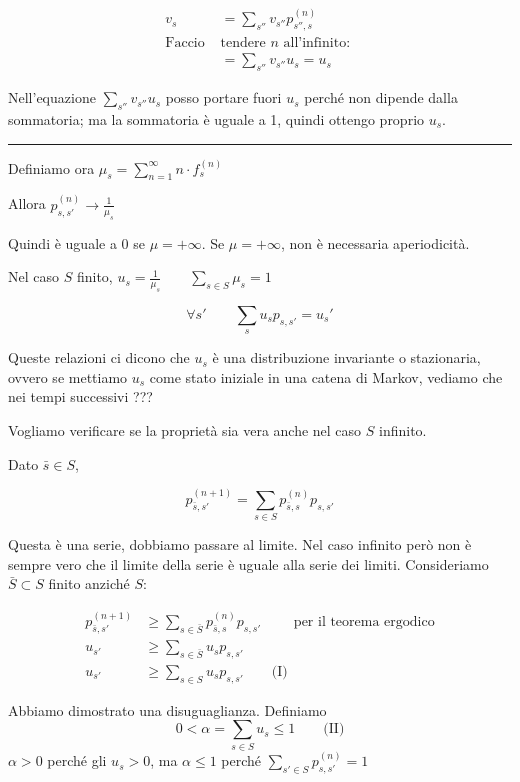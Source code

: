 \documentclass[a4paper,12pt]{book}
\newcommand\ddfrac[2]{\frac{\displaystyle #1}{\displaystyle #2}}
\begin{document}
\begin{align*}
	v_s & = \sum_{s''}v_{s''}p_{s'',s}^{(n)} \\
	 \text{Faccio } & \text{tendere } n \text{ all'infinito: }\\
	& = \sum_{s''}v_{s''}u_s = u_s
\end{align*}

Nell'equazione $ \sum_{s''}v_{s''}u_s $ posso portare fuori $ u_s $ perché non dipende dalla sommatoria; ma la sommatoria è uguale a 1, quindi ottengo proprio $ u_s $.

\vspace{1cm}
\hrule  %
\vspace{1cm}
Definiamo ora $ \mu_s = \sum_{n=1}^{\infty} n \cdot f_s^{(n)} $

Allora $ p_{s,s'}^{(n)} \to \ddfrac{1}{\mu_s} $

Quindi è uguale a 0 se $ \mu = +\infty $. Se $ \mu= +\infty $, non è necessaria aperiodicità. 

Nel caso $ S $ finito, $ u_s = \ddfrac{1}{\mu_s} \qquad \displaystyle \sum_{s \in S} \mu_s = 1 $ %

$$ \forall s' \qquad \sum_{s} u_s p_{s,s'} = u_s'$$

Queste relazioni ci dicono che $ u_s $ è una distribuzione invariante o stazionaria, ovvero se mettiamo $ u_s $ come stato iniziale in una catena di Markov, vediamo che nei tempi successivi ??? %

Vogliamo verificare se la proprietà sia vera anche nel caso $ S $ infinito. 

Dato $ \bar{s} \in S $,

$$ p_{\bar{s},s'}^{(n+1)} = \sum_{s \in S} p_{\bar{s}, s}^{(n)} p_{s,s'} $$


Questa è una serie, dobbiamo passare al limite. Nel caso infinito però non è sempre vero che il limite della serie è uguale alla serie dei limiti. Consideriamo $ \bar{S} \subset S $ finito anziché $ S $:

\begin{align*}
	p_{\bar{s}, s'}^{(n+1)} & \ge \sum_{s \in \bar{S} } p_{\bar{s},s}^{(n)} p_{s,s'} \qquad \text { per il teorema ergodico} \\
	u_{s'} & \ge \sum_{s \in \bar{S}} u_s p_{s,s'} \\
	u_{s'} & \ge \sum_{s \in S} u_sp_{s,s'} \qquad \text{(I)}
\end{align*}

Abbiamo dimostrato una disuguaglianza. Definiamo 
$$ 0 < \alpha = \sum_{s \in S} u_s \le 1 \qquad \text{(II)} $$
$\alpha > 0$ perché gli $ u_s > 0$, ma $ \alpha \le 1$ perché $ \sum_{s' \in S} p_{s,s'}^{(n)} = 1 $
\end{document}
